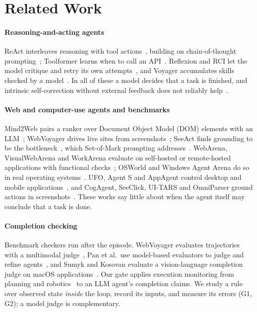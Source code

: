 \section{Related Work}
\label{sec:related}

\paragraph{Reasoning-and-acting agents} ReAct interleaves reasoning with tool actions~\cite{yao2023react}, building on chain-of-thought prompting~\cite{wei2022chain}; Toolformer learns when to call an API~\cite{schick2023toolformer}. Reflexion and RCI let the model critique and retry its own attempts~\cite{shinn2023reflexion,kim2023rci}, and Voyager accumulates skills checked by a model~\cite{wang2024voyager}. In all of these a model decides that a task is finished, and intrinsic self-correction without external feedback does not reliably help~\cite{huang2024cannot}.

\paragraph{Web and computer-use agents and benchmarks} Mind2Web pairs a ranker over Document Object Model (DOM) elements with an LLM~\cite{deng2023mind2web}; WebVoyager drives live sites from screenshots~\cite{he2024webvoyager}; SeeAct finds grounding to be the bottleneck~\cite{zheng2024seeact}, which Set-of-Mark prompting addresses~\cite{yang2023som}. WebArena, VisualWebArena and WorkArena evaluate on self-hosted or remote-hosted applications with functional checks~\cite{zhou2024webarena,koh2024visualwebarena,drouin2024workarena}; OSWorld and Windows Agent Arena do so in real operating systems~\cite{xie2024osworld,bonatti2024waa}. UFO, Agent S and AppAgent control desktop and mobile applications~\cite{zhang2025ufo,agashe2025agents,zhang2025appagent}, and CogAgent, SeeClick, UI-TARS and OmniParser ground actions in screenshots~\cite{hong2024cogagent,cheng2024seeclick,qin2025uitars,lu2024omniparser}. These works say little about when the agent itself may conclude that a task is done.

\paragraph{Completion checking} Benchmark checkers run after the episode. WebVoyager evaluates trajectories with a multimodal judge~\cite{he2024webvoyager}, Pan et al.\ use model-based evaluators to judge and refine agents~\cite{pan2024autonomous}, and Sumyk and Kosovan evaluate a vision-language completion judge on macOS applications~\cite{sumyk2025done}. Our gate applies execution monitoring from planning and robotics~\cite{fikes1972planex,pettersson2005execution} to an LLM agent's completion claims. We study a rule over observed state \emph{inside} the loop, record its inputs, and measure its errors (G1, G2); a model judge is complementary.

